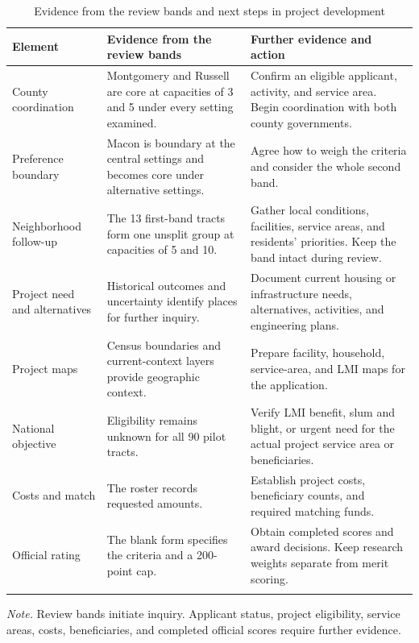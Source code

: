 \begin{table}[htbp]
\caption{Evidence from the review bands and next steps in project development}
\label{tab:readiness}
\centering\small
\renewcommand{\arraystretch}{1.2}
\begin{tabularx}{\linewidth}{@{}>{\raggedright\arraybackslash}p{.25\linewidth}>{\raggedright\arraybackslash}X>{\raggedright\arraybackslash}X@{}}
\toprule
Element & Evidence from the review bands & Further evidence and action \\
\midrule
County coordination & Montgomery and Russell are core at capacities of 3 and 5 under every setting examined. & Confirm an eligible applicant, activity, and service area. Begin coordination with both county governments. \\
\addlinespace[0.35em]
Preference boundary & Macon is boundary at the central settings and becomes core under alternative settings. & Agree how to weigh the criteria and consider the whole second band. \\
\addlinespace[0.35em]
Neighborhood follow-up & The 13 first-band tracts form one unsplit group at capacities of 5 and 10. & Gather local conditions, facilities, service areas, and residents’ priorities. Keep the band intact during review. \\
\addlinespace[0.35em]
Project need and alternatives & Historical outcomes and uncertainty identify places for further inquiry. & Document current housing or infrastructure needs, alternatives, activities, and engineering plans. \\
\addlinespace[0.35em]
Project maps & Census boundaries and current-context layers provide geographic context. & Prepare facility, household, service-area, and LMI maps for the application. \\
\addlinespace[0.35em]
National objective & Eligibility remains unknown for all 90 pilot tracts. & Verify LMI benefit, slum and blight, or urgent need for the actual project service area or beneficiaries. \\
\addlinespace[0.35em]
Costs and match & The roster records requested amounts. & Establish project costs, beneficiary counts, and required matching funds. \\
\addlinespace[0.35em]
Official rating & The blank form specifies the criteria and a 200-point cap. & Obtain completed scores and award decisions. Keep research weights separate from merit scoring. \\
\addlinespace[0.35em]
\bottomrule
\end{tabularx}
\par\medskip
\begin{minipage}{\linewidth}\small
\textit{Note.} Review bands initiate inquiry. Applicant status, project eligibility, service areas, costs, beneficiaries, and completed official scores require further evidence.
\end{minipage}
\end{table}

